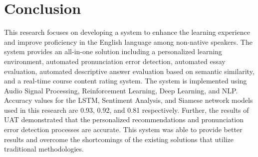 \documentclass[conference]{IEEEtran}
\begin{document}
\section{Conclusion}

This research focuses on developing a system to enhance the learning experience and improve proficiency in the English language among non-native speakers. The system provides an all-in-one solution including a personalized learning environment, automated pronunciation error detection, automated essay evaluation, automated descriptive answer evaluation based on semantic similarity, and a real-time course content rating system. The system is implemented using Audio Signal Processing, Reinforcement Learning, Deep Learning, and NLP. Accuracy values for the LSTM, Sentiment Analysis, and Siamese network models used in this research are 0.93, 0.92, and 0.81 respectively. Further, the results of UAT demonstrated that the personalized recommendations and pronunciation error detection processes are accurate. This system was able to provide better results and overcome the shortcomings of the existing solutions that utilize traditional methodologies.
\end{document}

